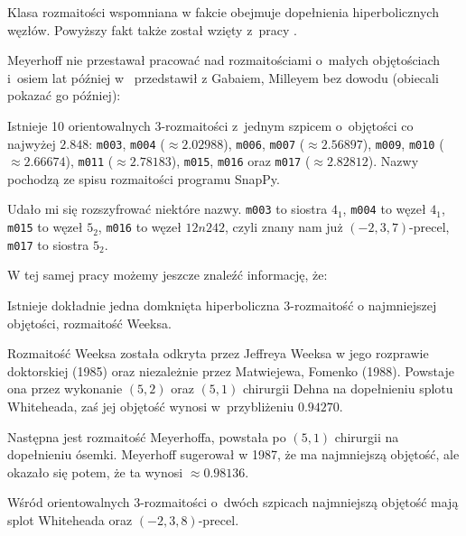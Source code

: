 Klasa rozmaitości wspomniana w fakcie obejmuje dopełnienia hiperbolicznych węzłów.
Powyższy fakt także został wzięty z~pracy \cite{cao01}.

Meyerhoff nie przestawał pracować nad rozmaitościami o~małych objętościach i~osiem lat później w~\cite{meyerhoff09} przedstawił z Gabaiem, Milleyem bez dowodu (obiecali pokazać go później):

\begin{proposition}
    Istnieje 10 orientowalnych 3-rozmaitości z~jednym szpicem o~objętości co najwyżej $2.848$: \texttt{m003}, \texttt{m004} ($\approx 2.02988$), \texttt{m006}, \texttt{m007} ($\approx 2.56897$), \texttt{m009}, \texttt{m010} ($\approx 2.66674$), \texttt{m011} ($\approx 2.78183$), \texttt{m015}, \texttt{m016} oraz \texttt{m017} ($\approx 2.82812$).
    Nazwy pochodzą ze spisu rozmaitości programu SnapPy.
\end{proposition}

Udało mi się rozszyfrować niektóre nazwy.
\texttt{m003} to siostra $4_1$, %
\texttt{m004} to węzeł $4_1$, %
\texttt{m015} to węzeł $5_2$,
\texttt{m016} to węzeł $12n242$, czyli znany nam już $(-2, 3, 7)$-precel,
%
\texttt{m017} to siostra $5_2$. %

W tej samej pracy możemy jeszcze znaleźć informację, że:

\begin{proposition}
    Istnieje dokładnie jedna domknięta hiperboliczna 3-rozmaitość o najmniejszej objętości, rozmaitość Weeksa.
\end{proposition}

Rozmaitość Weeksa została odkryta przez Jeffreya Weeksa w jego rozprawie doktorskiej (1985) oraz niezależnie przez Matwiejewa, Fomenko (1988).
Powstaje ona przez wykonanie $(5, 2)$ oraz $(5, 1)$ chirurgii Dehna na dopełnieniu splotu Whiteheada, zaś jej objętość wynosi w~przybliżeniu $0.94270$. %

Następna jest rozmaitość Meyerhoffa, powstała po $(5, 1)$ chirurgii na dopełnieniu ósemki.
Meyerhoff sugerował w 1987, że ma najmniejszą objętość, ale okazało się potem, że ta wynosi $\approx 0.98136$.

\begin{proposition}
    Wśród orientowalnych 3-rozmaitości o~dwóch szpicach najmniejszą objętość mają splot Whiteheada oraz $(-2, 3, 8)$-precel.
%
%
\end{proposition}

